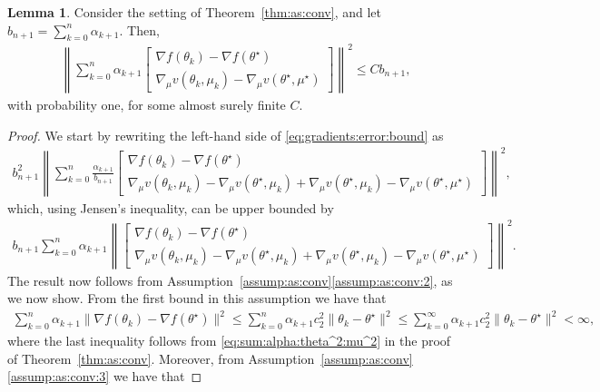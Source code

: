 \documentclass[11pt,a4paper]{article}
\theoremstyle{definition}
\newtheorem{lemma}[theorem]{Lemma}
\begin{document}
\begin{lemma}
\label{lemma:gradients:error:bound}
Consider the setting of Theorem~\ref{thm:as:conv}, and let $b_{n+1} = \sum_{k=0}^n \alpha_{k+1}$. Then, 
\begin{align}
\label{eq:gradients:error:bound}
    \left\|\sum_{k=0}^n \alpha_{k+1} \begin{bmatrix}\nabla {f}(\theta_k) - \nabla {f}(\theta^\star) \\ \nabla_\mu v(\theta_k,\mu_k) - \nabla_\mu v(\theta^\star,\mu^\star)\end{bmatrix} \right\|^2 \leq C b_{n+1},
\end{align}
with probability one, for some almost surely finite $C$.
\end{lemma}
\begin{proof}
We start by rewriting the left-hand side of \eqref{eq:gradients:error:bound} as
\begin{align*}
    b_{n+1}^2\left\|\sum_{k=0}^n \frac{\alpha_{k+1}}{b_{n+1}}  \begin{bmatrix}\nabla {f}(\theta_k) - \nabla {f}(\theta^\star) \\ \nabla_\mu v(\theta_k,\mu_k) -\nabla_\mu v(\theta^\star,\mu_k) + \nabla_\mu v(\theta^\star,\mu_k) - \nabla_\mu v(\theta^\star,\mu^\star)\end{bmatrix} \right\|^2,
\end{align*}
which, using Jensen's inequality, can be upper bounded by
\begin{align*}
    b_{n+1}\sum_{k=0}^n \alpha_{k+1}\left\| \begin{bmatrix}\nabla {f}(\theta_k) - \nabla {f}(\theta^\star) \\ \nabla_\mu v(\theta_k,\mu_k) -\nabla_\mu v(\theta^\star,\mu_k) + \nabla_\mu v(\theta^\star,\mu_k) - \nabla_\mu v(\theta^\star,\mu^\star)\end{bmatrix} \right\|^2.
\end{align*}
The result now follows from Assumption~\ref{assump:as:conv}\ref{assump:as:conv:2}, as we now show. From the first bound in this assumption we have that 
\begin{align*}
    \sum_{k=0}^n \alpha_{k+1}\|\nabla {f}(\theta_k) - \nabla{f}(\theta^\star)\|^2 \leq \sum_{k=0}^n \alpha_{k+1} c_2^2 \|\theta_k - \theta^\star\|^2 \leq \sum_{k=0}^\infty \alpha_{k+1} c_2^2 \|\theta_k - \theta^\star\|^2 < \infty,
\end{align*}
where the last inequality follows from \eqref{eq:sum:alpha:theta^2:mu^2} in the proof of Theorem~\ref{thm:as:conv}. Moreover, from Assumption~\ref{assump:as:conv}\ref{assump:as:conv:3} we have that

\end{proof}
\end{document}
